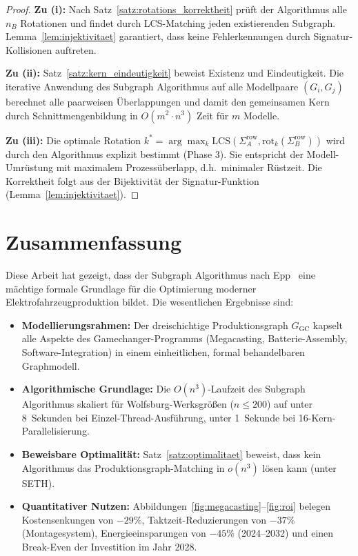 ﻿\documentclass[a4paper,12pt]{article}
\theoremstyle{definition}
\begin{document}
\begin{proof}
\textbf{Zu (i):} Nach Satz~\ref{satz:rotations_korrektheit} prüft der Algorithmus
alle $n_B$ Rotationen und findet durch LCS-Matching jeden existierenden Subgraph.
Lemma~\ref{lem:injektivitaet} garantiert, dass keine Fehlerkennungen durch
Signatur-Kollisionen auftreten.

\textbf{Zu (ii):} Satz~\ref{satz:kern_eindeutigkeit} beweist Existenz und Eindeutigkeit.
Die iterative Anwendung des Subgraph Algorithmus auf alle Modellpaare $(G_i, G_j)$
berechnet alle paarweisen Überlappungen und damit den gemeinsamen Kern durch Schnittmengenbildung
in $O(m^2 \cdot n^3)$ Zeit für $m$ Modelle.

\textbf{Zu (iii):} Die optimale Rotation $k^* = \arg\max_{k} \mathrm{LCS}(\Sigma_A^{\mathrm{row}}, \mathrm{rot}_k(\Sigma_B^{\mathrm{row}}))$
wird durch den Algorithmus explizit bestimmt (Phase 3). Sie entspricht der Modell-Umrüstung
mit maximalem Prozessüberlapp, d.h.\ minimaler Rüstzeit. Die Korrektheit folgt aus der
Bijektivität der Signatur-Funktion (Lemma~\ref{lem:injektivitaet}).
\end{proof}

\section{Zusammenfassung}

Diese Arbeit hat gezeigt, dass der Subgraph Algorithmus nach Epp~\cite{epp2026} eine
mächtige formale Grundlage für die Optimierung moderner Elektrofahrzeugproduktion bildet.
Die wesentlichen Ergebnisse sind:

\begin{itemize}
\item \textbf{Modellierungsrahmen:} Der dreischichtige Produktionsgraph $G_{\mathrm{GC}}$
  kapselt alle Aspekte des Gamechanger-Programms (Megacasting, Batterie-Assembly, Software-Integration)
  in einem einheitlichen, formal behandelbaren Graphmodell.

\item \textbf{Algorithmische Grundlage:} Die $O(n^3)$-Laufzeit des Subgraph Algorithmus
  skaliert für Wolfsburg-Werksgrößen ($n \leq 200$) auf unter 8~Sekunden bei
  Einzel-Thread-Ausführung, unter 1~Sekunde bei 16-Kern-Parallelisierung.

\item \textbf{Beweisbare Optimalität:} Satz~\ref{satz:optimalitaet} beweist, dass kein
  Algorithmus das Produktionsgraph-Matching in $o(n^3)$ lösen kann (unter SETH).

\item \textbf{Quantitativer Nutzen:} Abbildungen~\ref{fig:megacasting}--\ref{fig:roi}
  belegen Kostensenkungen von $-29\%$, Taktzeit-Reduzierungen von $-37\%$ (Montagesystem),
  Energieeinsparungen von $-45\%$ (2024--2032) und einen Break-Even der Investition im Jahr 2028.
\end{itemize}
\end{document}
